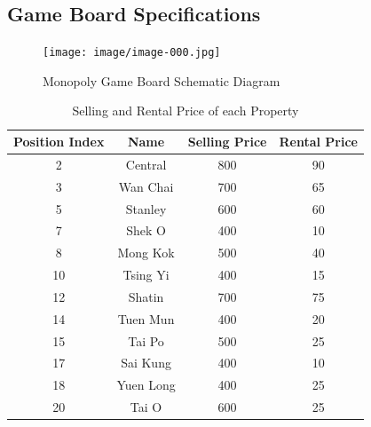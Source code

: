     \subsection{Game Board Specifications}
    \label{sec:board-specs}
      \begin{figure}[ht!]
        \centering
        \texttt{[image: image/image-000.jpg]}
        \caption{Monopoly Game Board Schematic Diagram}
        \label{fig:game-board}
      \end{figure}
      \begin{table}[!htbp]
        \centering
        \begin{tabular}{c|c|c|c}
          \toprule
          Position Index & Name & Selling Price & Rental Price \\
          \midrule
          2 & Central & 800 & 90 \\
          3 & Wan Chai & 700 & 65 \\
          5 & Stanley & 600 & 60 \\
          7 & Shek O & 400 & 10 \\
          8 & Mong Kok & 500 & 40 \\
          10 & Tsing Yi & 400 & 15 \\
          12 & Shatin & 700 & 75 \\
          14 & Tuen Mun & 400 & 20 \\
          15 & Tai Po & 500 & 25 \\
          17 & Sai Kung & 400 & 10 \\
          18 & Yuen Long & 400 & 25 \\
          20 & Tai O & 600 & 25 \\
          \bottomrule
        \end{tabular}
        \caption{Selling and Rental Price of each Property}
        \label{table:property-price}
      \end{table}
